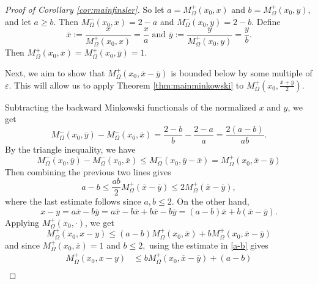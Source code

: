 \documentclass[letterpaper, 11pt, reqno]{amsart}
\theoremstyle{definition}
\begin{document}
\begin{proof}[Proof of Corollary \ref{cor:mainfinsler}]
So let $a = M^+_\Omega(x_0,x)$ and $b = M^+_\Omega(x_0,y)$, and let $a \geq b$. Then $M^-_\Omega(x_0,x) = 2-a$ and $M^-_\Omega(x_0,y) = 2-b$. Define
\begin{equation}
    \overline{x} := \frac{x}{M^+_\Omega(x_0,x)}=\frac{x}{a} \text{ and } \overline{y} := \frac{y}{M^+_\Omega(x_0,y)}=\frac{y}{b}.
\end{equation}
Then $M^+_\Omega(x_0, \overline{x}) = M^+_\Omega(x_0, \overline{y}) = 1$.

Next, we aim to show that $M^+_\Omega(x_0, \overline{x}-\overline{y})$ is bounded below by some multiple of $\varepsilon$. This will allow us to apply Theorem \ref{thm:mainminkowski} to $M^+_\Omega(x_0,\frac{\overline{x}+\overline{y}}{2})$.

Subtracting the backward Minkowski functionals of the normalized $x$ and $y$, we get
\begin{equation}
 M^-_\Omega(x_0, \overline{y})-M^-_\Omega(x_0, \overline{x})= \frac{2-b}{b} - \frac{2-a}{a} = \frac{2(a-b)}{ab}.  
\end{equation}
By the triangle inequality, we have
\begin{equation}
 M^-_\Omega(x_0, \overline{y})-M^-_\Omega(x_0, \overline{x}) \leq M^-_\Omega(x_0, \overline{y}-\overline{x}) = M^+_\Omega(x_0, \overline{x}-\overline{y})
\end{equation}
Then combining the previous two lines gives
\begin{equation}\label{a-b}
    a-b \leq \frac{ab}{2} M^+_\Omega(\overline{x}-\overline{y}) \leq 2 M^+_\Omega(\overline{x}-\overline{y}),
\end{equation}
where the last estimate follows since $a,b \leq 2.$
On the other hand,
\begin{equation}
    x-y = a\overline{x} - b\overline{y} = a\overline{x}-b\overline{x}+b\overline{x}-b\overline{y} = (a-b)\overline{x}+b(\overline{x}-\overline{y}).
\end{equation}
Applying $M^+_\Omega(x_0,\cdot)$, we get
\begin{equation}
    M^+_\Omega(x_0,x-y) \leq (a-b)M^+_\Omega(x_0,\overline{x}) + bM^+_\Omega(x_0,\overline{x}-\overline{y})
\end{equation}
and since $M^+_\Omega(x_0,\overline{x})=1$ and $b \leq 2,$ using the estimate in \ref{a-b} gives
\begin{align}
 M^+_\Omega(x_0,x-y) & \leq bM^+_\Omega(x_0,\overline{x}-\overline{y}) + (a-b)\\

\end{align}
\end{proof}
\end{document}
